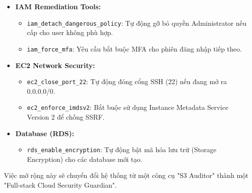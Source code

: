 \begin{itemize}
    \item \textbf{IAM Remediation Tools:}
    \begin{itemize}
        \item \texttt{iam\_detach\_dangerous\_policy}: Tự động gỡ bỏ quyền Administrator nếu cấp cho user không phù hợp.
        \item \texttt{iam\_force\_mfa}: Yêu cầu bắt buộc MFA cho phiên đăng nhập tiếp theo.
    \end{itemize}
    \item \textbf{EC2 Network Security:}
    \begin{itemize}
        \item \texttt{ec2\_close\_port\_22}: Tự động đóng cổng SSH (22) nếu đang mở ra 0.0.0.0/0.
        \item \texttt{ec2\_enforce\_imdsv2}: Bắt buộc sử dụng Instance Metadata Service Version 2 để chống SSRF.
    \end{itemize}
    \item \textbf{Database (RDS):}
    \begin{itemize}
        \item \texttt{rds\_enable\_encryption}: Tự động bật mã hóa lưu trữ (Storage Encryption) cho các database mới tạo.
    \end{itemize}
\end{itemize}

Việc mở rộng này sẽ chuyển đổi hệ thống từ một công cụ "S3 Auditor" thành một "Full-stack Cloud Security Guardian".